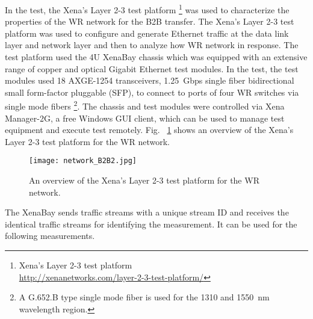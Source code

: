 In the test, the Xena's Layer 2-3 test platform \footnote{Xena's Layer 2-3 test platform\\ \url{http://xenanetworks.com/layer-2-3-test-platform/}} was used to characterize the properties of the WR network for the B2B transfer. The Xena's Layer 2-3 test platform was used to configure and generate Ethernet traffic at the data link layer and network layer and then to analyze how WR network in response. The test platform used the 4U XenaBay chassis which was equipped with an extensive range of copper and optical Gigabit Ethernet test modules. In the test, the test modules used 18 AXGE-1254 transceivers, \SI{1.25}{Gbps} single fiber bidirectional small form-factor pluggable (SFP), to connect to ports of four WR switches via single mode fibers \footnote{A G.652.B type single mode fiber is used for the 1310 and \SI{1550}{nm} wavelength region.}. The chassis and test modules were controlled via Xena Manager-2G, a free Windows GUI client, which can be used to manage test equipment and execute test remotely. Fig. ~\ref{network_B2B2} shows an overview of the Xena's Layer 2-3 test platform for the WR network.
\begin{figure}[H]
   \centering   
   \texttt{[image: network\_B2B2.jpg]}
   \caption{An overview of the Xena's Layer 2-3 test platform for the WR network.}
   \label{network_B2B2}
\end{figure}

The XenaBay sends traffic streams with a unique stream ID and receives the identical traffic streams for identifying the measurement. It can be used for the following measurements.

